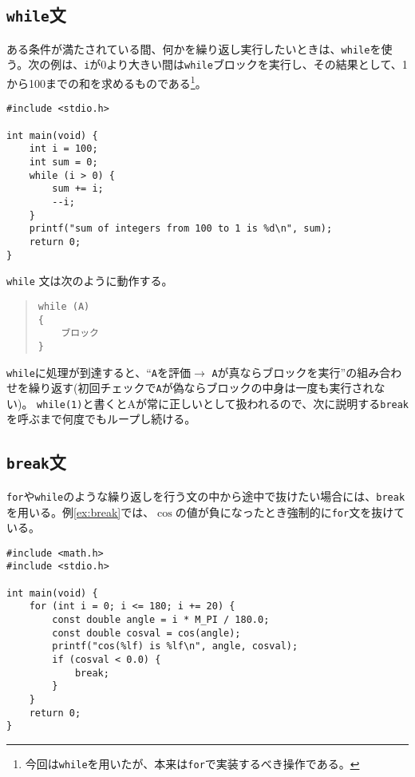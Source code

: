 \subsection{\texttt{while}文}
ある条件が満たされている間、何かを繰り返し実行したいときは、\texttt{while}を使う。次の例は、\texttt{i}が0より大きい間は\texttt{while}ブロックを実行し、その結果として、1から100までの和を求めるものである\footnote{今回は\texttt{while}を用いたが、本来は\texttt{for}で実装するべき操作である。}。
\begin{reidai}\label{ex:while}
\begin{verbatim}
#include <stdio.h>

int main(void) {
    int i = 100;
    int sum = 0;
    while (i > 0) {
        sum += i;
        --i;
    }
    printf("sum of integers from 100 to 1 is %d\n", sum);
    return 0;
}
\end{verbatim}
\end{reidai} \noindent
\texttt{while} 文は次のように動作する。
\begin{quote}
\begin{verbatim}
while (A)
{
    ブロック
}
\end{verbatim}
\end{quote}
\texttt{while}に処理が到達すると、``\texttt{A}を評価\(\rightarrow\) \texttt{A}が真ならブロックを実行''の組み合わせを繰り返す(初回チェックで\texttt{A}が偽ならブロックの中身は一度も実行されない)。
\texttt{while(1)}と書くとAが常に正しいとして扱われるので、次に説明する\texttt{break}を呼ぶまで何度でもループし続ける。

\subsection{\texttt{break}文}
\texttt{for}や\texttt{while}のような繰り返しを行う文の中から途中で抜けたい場合には、\texttt{break}を用いる。例\ref{ex:break}では、\(\cos\)の値が負になったとき強制的に\texttt{for}文を抜けている。
\begin{reidai}\label{ex:break}
    \begin{verbatim}
#include <math.h>
#include <stdio.h>

int main(void) {
    for (int i = 0; i <= 180; i += 20) {
        const double angle = i * M_PI / 180.0;
        const double cosval = cos(angle);
        printf("cos(%lf) is %lf\n", angle, cosval);
        if (cosval < 0.0) {
            break;
        }
    }
    return 0;
}
\end{verbatim}
\end{reidai}

